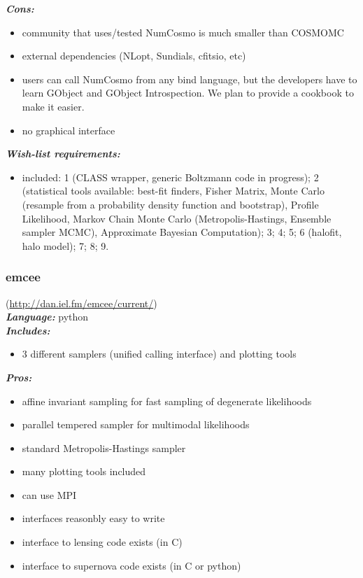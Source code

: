 {\it \bf Cons:} 
\begin{itemize}
 \item 	community that uses/tested NumCosmo is much smaller than COSMOMC
 \item 	external dependencies (NLopt, Sundials, cfitsio, etc)
 \item 	users can call NumCosmo from any bind language, but the developers have to learn GObject and GObject Introspection. We plan to provide a cookbook to make it easier.
 \item 	no graphical interface
 \end{itemize}

{\it \bf Wish-list requirements: }
\begin{itemize}
 \item included: 1 (CLASS wrapper, generic Boltzmann code in progress); 2 (statistical tools available: best-fit finders, Fisher Matrix,  Monte Carlo (resample from a probability density function and bootstrap), Profile Likelihood, Markov Chain Monte Carlo (Metropolis-Hastings, Ensemble sampler MCMC), Approximate Bayesian Computation); 3; 4; 5; 6 (halofit, halo model); 7; 8; 9.
\end{itemize}

\newpage
\subsubsection{emcee} 

(\url{http://dan.iel.fm/emcee/current/})\\

{\it \bf Language:} python\\

{\it \bf Includes:}
\begin{itemize}
 \item 3 different samplers (unified calling interface) and plotting tools
\end{itemize}

{\it \bf Pros:} 
\begin{itemize}
 \item affine invariant sampling for fast sampling of degenerate likelihoods
 \item parallel tempered sampler for multimodal likelihoods
 \item standard Metropolis-Hastings sampler
 \item many plotting tools included
 \item can use MPI
 \item interfaces reasonbly easy to write
 \item interface to lensing code exists (in C)
 \item interface to supernova code exists (in C or python)
 \end{itemize}

